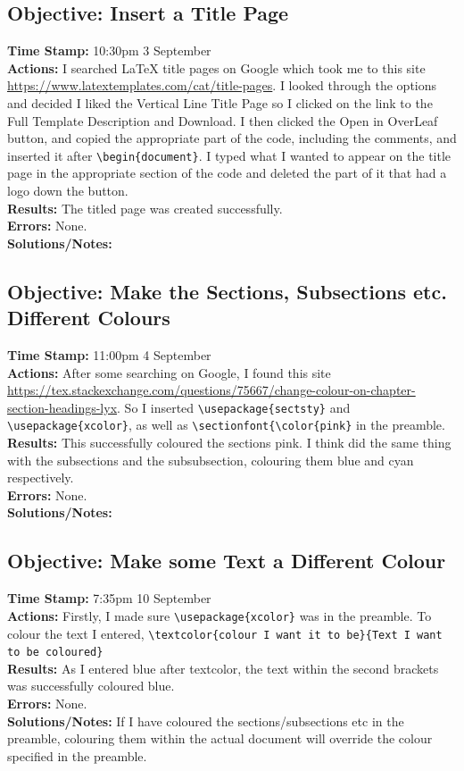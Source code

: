 \documentclass{article}
\begin{document}
\begin{FlushLeft}
\subsection{Objective: Insert a Title Page}
\textbf{Time Stamp:} 10:30pm 3 September\\
\textbf{Actions:} I searched LaTeX title pages on Google which took me to this site \url{https://www.latextemplates.com/cat/title-pages}. I looked through the options and decided I liked the Vertical Line Title Page so I clicked on the link to the Full Template Description and Download. I then clicked the Open in OverLeaf button, and copied the appropriate part of the code, including the comments, and inserted it after \verb|\begin{document}|. I typed what I wanted to appear on the title page in the appropriate section of the code and deleted the part of it that had a logo down the button. \\
\textbf{Results:} The titled page was created successfully.\\
\textbf{Errors:} None.\\
\textbf{Solutions/Notes:}

\subsection{Objective: Make the Sections, Subsections etc. Different Colours}
\textbf{Time Stamp:} 11:00pm 4 September\\
\textbf{Actions:} After some searching on Google, I found this site \url{https://tex.stackexchange.com/questions/75667/change-colour-on-chapter-section-headings-lyx}. So I inserted \verb|\usepackage{sectsty}| and \verb|\usepackage{xcolor}|, as well as \verb|\sectionfont{\color{pink}| in the preamble.\\
\textbf{Results:} This successfully coloured the sections pink. I think did the same thing with the subsections and the subsubsection, colouring them blue and cyan respectively.\\
\textbf{Errors:} None.\\
\textbf{Solutions/Notes:} 

\subsection{Objective: Make some Text a Different Colour}
\textbf{Time Stamp:} 7:35pm 10 September\\
\textbf{Actions:} Firstly, I made sure \verb|\usepackage{xcolor}| was in the preamble. To colour the text I entered, \verb|\textcolor{colour I want it to be}{Text I want to be coloured}|\\
\textbf{Results:} As I entered blue after textcolor, the text within the second brackets was successfully coloured blue.\\
\textbf{Errors:} None.\\
\textbf{Solutions/Notes:} If I have coloured the sections/subsections etc in the preamble, colouring them within the actual document will override the colour specified in the preamble.


\end{FlushLeft}
\end{document}
